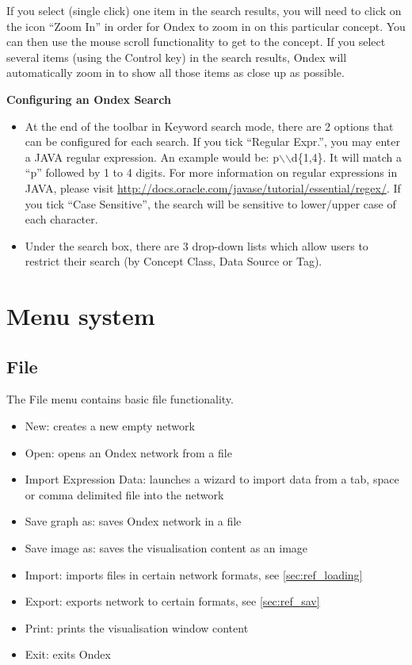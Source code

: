 If you select (single click) one item in the search results, you will need to click on the icon ``Zoom In'' in order for Ondex to zoom in on this particular concept. 
You can then use the mouse scroll functionality to get to the concept.
If you select several items (using the Control key) in the search results, Ondex will automatically zoom in to show all those items as close up as possible.

\textbf{Configuring an Ondex Search }
\begin{itemize}
\item At the end of the toolbar in Keyword search mode, there are 2 options that can be configured for each search. 
If you tick ``Regular Expr.'', you may enter a JAVA regular expression. An example would be: p$\backslash$$\backslash$d\{1,4\}.
It will match a ``p'' followed by 1 to 4 digits. 
For more information on regular expressions in JAVA, please visit \url{http://docs.oracle.com/javase/tutorial/essential/regex/}.
If you tick ``Case Sensitive'', the search will be sensitive to lower/upper case of each character.
\item Under the search box, there are 3 drop-down lists which allow users to restrict their search (by Concept Class, Data Source or Tag).
\end{itemize}


\section{Menu system}
\label{sec:ref_menus}
 
\subsection{File}
\label{sec:menu_file}
The File menu contains basic file functionality.
\begin{itemize}
\item New: creates a new empty network 
\item Open: opens an Ondex network from a file
\item Import Expression Data: launches a wizard to import data from a tab, space or comma delimited file into the network 
\item Save graph as: saves Ondex network in a file
\item Save image as: saves the visualisation content as an image
\item Import: imports files in certain network formats, see \ref{sec:ref_loading}
\item Export: exports network to certain formats, see \ref{sec:ref_sav}
\item Print: prints the visualisation window content
\item Exit: exits Ondex
\end{itemize}

